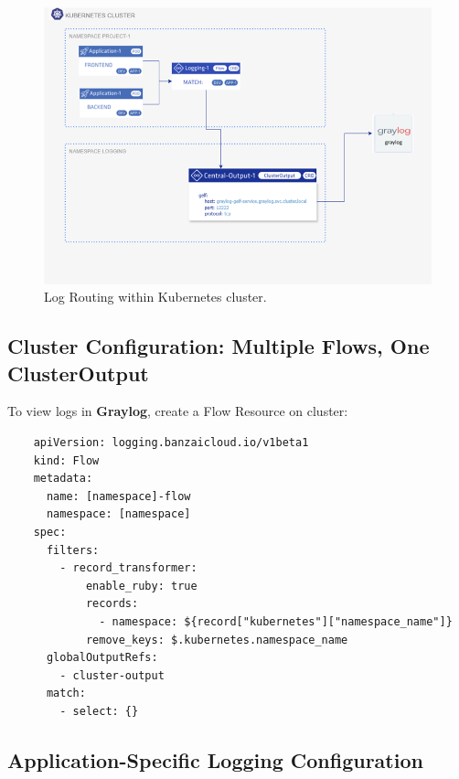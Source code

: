 \documentclass[../main.tex]{subfiles}
\begin{document}
\begin{figure}[h]
        \centering
        \includegraphics[scale=0.9]{img/3-background/centralized_logging/flows_output.png}
        \caption{Log Routing within Kubernetes cluster. \protect\footnotemark}
        \label{fig:flows_output}
\end{figure}


\subsection{Cluster Configuration: Multiple Flows, One ClusterOutput}

To view logs in \textbf{Graylog}, create a Flow Resource on cluster:

\begin{verbatim}
    apiVersion: logging.banzaicloud.io/v1beta1
    kind: Flow
    metadata:
      name: [namespace]-flow
      namespace: [namespace]
    spec:
      filters:
        - record_transformer:
            enable_ruby: true
            records:
              - namespace: ${record["kubernetes"]["namespace_name"]}
            remove_keys: $.kubernetes.namespace_name
      globalOutputRefs:
        - cluster-output
      match:
        - select: {}
\end{verbatim}

\subsection{Application-Specific Logging Configuration}
\end{document}
